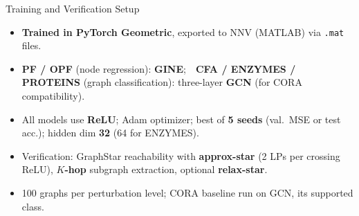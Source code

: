 \documentclass[11pt,aspectratio=169,t]{beamer}
\newcommand{\key}[1]{\textbf{\textcolor{VUgoldDark}{#1}}}
\begin{document}
\begin{frame}[noframenumbering]{Training and Verification Setup}
  \begin{itemize}\itemsep=1ex
    \item \textbf{Trained in PyTorch Geometric}, exported to NNV (MATLAB) via
          \texttt{.mat} files.
    \item \textbf{PF / OPF} (node regression): \textbf{GINE};\ \
          \textbf{CFA / ENZYMES / PROTEINS} (graph classification): three-layer
          \textbf{GCN} (for CORA compatibility).
    \item All models use \textbf{ReLU}; Adam optimizer; best of \textbf{5 seeds}
          (val.\ MSE or test acc.); hidden dim \textbf{32} (64 for ENZYMES).
    \item Verification: GraphStar reachability with \key{approx-star} (2 LPs per
          crossing ReLU), \key{$K$-hop} subgraph extraction, optional
          \key{relax-star}.
    \item 100 graphs per perturbation level; CORA baseline run on GCN, its
          supported class.
  \end{itemize}
\end{frame}
\end{document}
